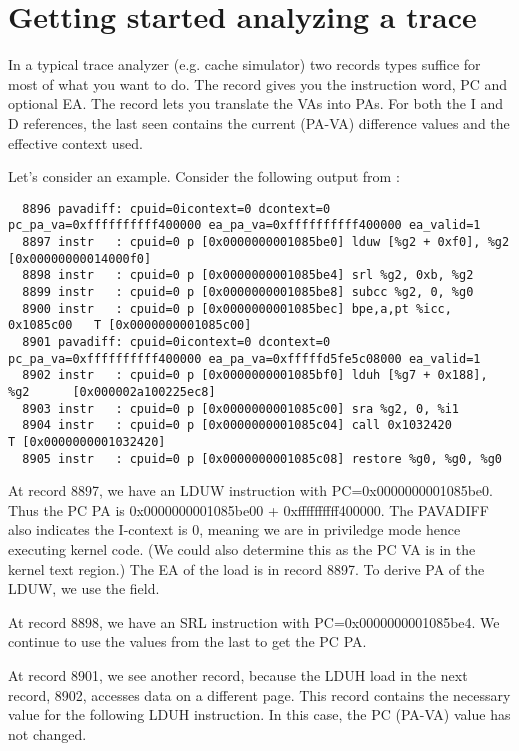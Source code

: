 \documentclass[10pt]{article}
\begin{document}
\section{Getting started analyzing a trace}

In a typical trace analyzer (e.g. cache simulator) two records types
suffice for most of what you want to do.  The  record
gives you the instruction word, PC and optional EA.  The
 record lets you translate the VAs into PAs.  For
both the I and D references, the last seen  contains
the current (PA-VA) difference values and the effective context used.

Let's consider an example.  Consider the following output from
:

\begin{verbatim}
  8896 pavadiff: cpuid=0icontext=0 dcontext=0 pc_pa_va=0xffffffffff400000 ea_pa_va=0xffffffffff400000 ea_valid=1
  8897 instr   : cpuid=0 p [0x0000000001085be0] lduw [%g2 + 0xf0], %g2       [0x00000000014000f0] 
  8898 instr   : cpuid=0 p [0x0000000001085be4] srl %g2, 0xb, %g2          
  8899 instr   : cpuid=0 p [0x0000000001085be8] subcc %g2, 0, %g0          
  8900 instr   : cpuid=0 p [0x0000000001085bec] bpe,a,pt %icc, 0x1085c00   T [0x0000000001085c00] 
  8901 pavadiff: cpuid=0icontext=0 dcontext=0 pc_pa_va=0xffffffffff400000 ea_pa_va=0xfffffd5fe5c08000 ea_valid=1
  8902 instr   : cpuid=0 p [0x0000000001085bf0] lduh [%g7 + 0x188], %g2      [0x000002a100225ec8] 
  8903 instr   : cpuid=0 p [0x0000000001085c00] sra %g2, 0, %i1            
  8904 instr   : cpuid=0 p [0x0000000001085c04] call 0x1032420                  T [0x0000000001032420] 
  8905 instr   : cpuid=0 p [0x0000000001085c08] restore %g0, %g0, %g0      
\end{verbatim}

At record 8897, we have an LDUW instruction with PC=0x0000000001085be0.
Thus the PC PA is 0x0000000001085be00 + 0xffffffffff400000.  The
PAVADIFF also indicates the I-context is 0, meaning we are in priviledge
mode hence executing kernel code.  (We could also determine this as the
PC VA is in the kernel text region.)  The EA of the load is in record
8897.  To derive PA of the LDUW, we use the
 field.

At record 8898, we have an SRL instruction with PC=0x0000000001085be4.
We continue to use the values from the last  to get
the PC PA.

At record 8901, we see another  record, because the
LDUH load in the next record, 8902, accesses data on a different page.
This  record contains the necessary
 value for the following LDUH instruction.  In
this case, the PC (PA-VA) value has not changed.
\end{document}
